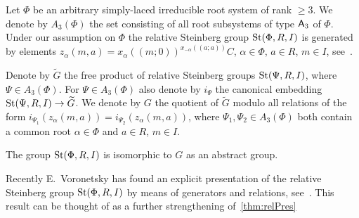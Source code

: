 Let $\Phi$ be an arbitrary simply-laced irreducible root system of rank $\geq 3$.
We denote by $A_3(\Phi)$ the set consisting of all root subsystems of type $\mathsf{A}_3$ of $\Phi$.
Under our assumption on $\Phi$ the relative Steinberg group $\operatorname{St}(\Phi, R, I)$ is generated by elements
$z_\alpha(m, a) = x_\alpha((m; 0))^{x_{-\alpha}((a; a))}C$, $\alpha \in \Phi$, $a \in R$, $m \in I$, see~\cite[\S~3.1]{S15}.

Denote by $\widetilde{G}$ the free product of relative Steinberg groups $\operatorname{St}(\Psi, R, I)$, where $\Psi \in A_3(\Phi)$.
For $\Psi \in A_3(\Phi)$ also denote by $i_\Psi$ the canonical embedding $\operatorname{St}(\Psi, R, I) \to \widetilde{G}$.
We denote by $G$ the quotient of $\widetilde{G}$ modulo all relations of the form $i_{\Psi_1}(z_\alpha(m, a)) = i_{\Psi_2}(z_\alpha(m, a))$,
where $\Psi_1, \Psi_2 \in A_3(\Phi)$ both contain a common root $\alpha \in \Phi$ and $a\in R$, $m \in I$.

\begin{thm}\label{thm:relPres} The group $\operatorname{St}(\Phi, R, I)$ is isomorphic to $G$ as an abstract group. \end{thm}

\begin{rem}
    Recently E.~Voronetsky has found an explicit presentation of the relative Steinberg group $\operatorname{St}(\Phi, R, I)$
     by means of generators and relations, see~\cite{V22}.
    This result can be thought of as a further strengthening of~\cref{thm:relPres}
\end{rem}
